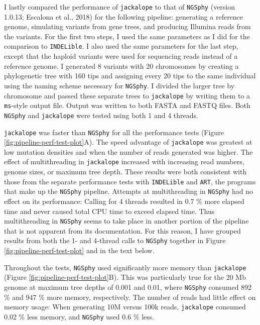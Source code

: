 \documentclass[12pt,]{article}
\begin{document}
I lastly compared the performance of \texttt{jackalope} to that of \texttt{NGSphy}
(version 1.0.13; Escalona et al., 2018)
for the following pipeline:
generating a reference genome, simulating variants from gene trees, and
producing Illumina reads from the variants.
For the first two steps, I used the same parameters as I did for the comparison to
\texttt{INDELible}.
I also used the same parameters for the last step, except that the haploid variants
were used for sequencing reads instead of a reference genome.
I generated 8 variants with 20 chromosomes by creating a phylogenetic tree with
160 tips and assigning every 20 tips to the same individual using the naming
scheme necessary for \texttt{NGSphy}.
I divided the larger tree by chromosome and passed these separate trees to
\texttt{jackalope} by writing them to a \texttt{ms}-style output file.
Output was written to both FASTA and FASTQ files.
Both \texttt{NGSphy} and \texttt{jackalope} were tested using both 1 and 4 threads.

\texttt{jackalope} was faster than \texttt{NGSphy} for all the performance tests
(Figure \ref{fig:pipeline-perf-test-plot}A).
The speed advantage of \texttt{jackalope} was greatest
at low mutation densities and when the number of reads generated was higher.
The effect of multithreading in \texttt{jackalope} increased with increasing read numbers,
genome sizes, or maximum tree depth.
These results were both consistent with those from the separate performance tests with
\texttt{INDELible} and \texttt{ART}, the programs that make up the \texttt{NGSphy} pipeline.
Attempts at multithreading in \texttt{NGSphy} had no effect on its performance:
Calling for 4 threads resulted in 0.7 \% more
elapsed time and never caused total CPU time to exceed elapsed time.
Thus multithreading in \texttt{NGSphy} seems to take place in another portion of the pipeline
that is not apparent from its documentation.
For this reason, I have grouped results from both the 1- and 4-thread calls to \texttt{NGSphy}
together in Figure \ref{fig:pipeline-perf-test-plot} and in the text below.

Throughout the tests, \texttt{NGSphy} used significantly more memory than \texttt{jackalope}
(Figure \ref{fig:pipeline-perf-test-plot}B).
This was particularly true for the 20 Mb genome at maximum tree depths of 0.001 and 0.01,
where \texttt{NGSphy} consumed
892 \%
and
947 \%
more memory, respectively.
The number of reads had little effect on memory usage: When generating 10M versus
100k reads, \texttt{jackalope} consumed 0.02 \%
less memory, and \texttt{NGSphy} used 0.6 \%
less.
\end{document}
